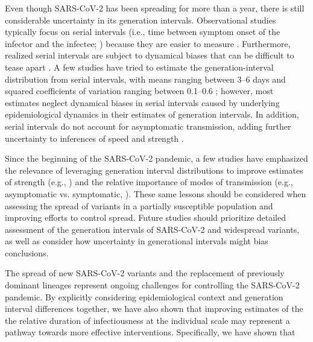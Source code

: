 \documentclass[12pt]{article}
\begin{document}
Even though SARS-CoV-2 has been spreading for more than a year, there is still considerable uncertainty in its generation intervals.
Observational studies typically focus on serial intervals (i.e., time between symptom onset of the infector and the infectee; \cite{svensson2007note}) because they are easier to measure \citep{griffin2020rapid}.
Furthermore, realized serial intervals are subject to dynamical biases that can be difficult to tease apart \citep{park2021forward}.
A few studies have tried to estimate the generation-interval distribution from serial intervals, with means ranging between 3--6 days and squared coefficients of variation ranging between 0.1--0.6 \citep{ferretti2020quantifying,Ferretti2020timing,ganyani2020estimating,knight2020estimating}; 
however, most estimates neglect dynamical biases in serial intervals caused by underlying epidemiological dynamics in their estimates of generation intervals.
In addition, serial intervals do not account for asymptomatic transmission, adding further uncertainty to inferences of speed and strength \citep{park2020time}.

Since the beginning of the SARS-CoV-2 pandemic, a few studies have emphasized the relevance of leveraging generation interval distributions to improve estimates of strength (e.g., \cite{doi:10.1098/rsif.2020.0144,park2021forward}) and the relative importance of modes of transmission (e.g., asymptomatic vs. symptomatic, \cite{park2020time}).
These same lessons should be considered when assessing the spread of variants in a partially susceptible population and improving efforts to control spread.
Future studies should prioritize detailed assessment of the generation intervals of SARS-CoV-2 and widespread variants, as well as consider how uncertainty in generational intervals might bias conclusions.

The spread of new SARS-CoV-2 variants and the replacement of previously dominant lineages represent ongoing challenges for controlling the SARS-CoV-2 pandemic.  
By explicitly considering epidemiological context and generation interval differences together, we have also shown that improving estimates of the the relative duration of infectiousness at the individual scale may represent a pathway towards more effective interventions. 
Specifically, we have shown that 


\end{document}
